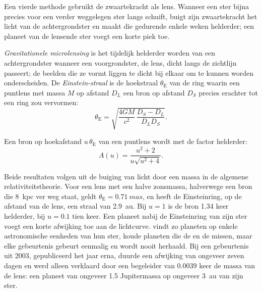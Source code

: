 Een vierde methode gebruikt de zwaartekracht als lens. Wanneer een ster bijna precies
voor een verder weggelegen ster langs schuift, buigt zijn zwaartekracht het licht van de
achtergrondster en maakt die gedurende enkele weken helderder; een planeet van de
lensende ster voegt een korte piek toe.

\begin{definition}\label{def:b3:exoplanets:microlensing}
\emph{Gravitationele microlensing} is het
tijdelijk helderder worden van een achtergrondster wanneer een voorgrondster, de
lens, dicht langs de zichtlijn passeert; de beelden die ze vormt liggen te dicht
bij elkaar om te kunnen worden onderscheiden. De \emph{Einstein-straal}
is de hoekstraal $\theta_\mathrm E$ van de ring waarin een puntlens
met massa $M$ op afstand $D_L$ een bron op afstand $D_S$ precies erachter
tot een ring zou vervormen:
\[
\theta_\mathrm E = \sqrt{\frac{4GM}{c^2}\,\frac{D_S - D_L}{D_L D_S}} .
\]
\end{definition}

\begin{proposition}\label{prop:b3:exoplanets:magnification}
Een bron op hoekafstand $u\,\theta_\mathrm E$ van een puntlens
wordt met de factor helderder:
\[
A(u) = \frac{u^2 + 2}{u\sqrt{u^2 + 4}} .
\]
\end{proposition}

\admitted

Beide resultaten volgen uit de buiging van licht door een massa in de algemene
relativiteitstheorie. Voor een lens met een halve zonsmassa, halverwege een bron
die \qty{8}{kpc} ver weg staat, geldt $\theta_\mathrm E = \qty{0.71}{mas}$, en
heeft de Einsteinring, op de afstand van de lens, een straal van \qty{2.9}{au}. Bij
$u = 1$ is de bron 1.34 keer helderder, bij $u = 0.1$ tien keer. Een
planeet nabij de Einsteinring van zijn ster voegt een korte afwijking toe aan de
lichtcurve.  vindt zo planeten op enkele astronomische
eenheden van hun ster, koude planeten die de  en de  missen,
maar elke gebeurtenis gebeurt eenmalig en wordt nooit herhaald. Bij een gebeurtenis uit 2003,
gepubliceerd het jaar erna, duurde een afwijking van ongeveer zeven dagen en werd
alleen verklaard door een begeleider van $\num{0.0039}$ keer de massa van de
lens: een planeet van ongeveer 1.5 Jupitermassa op ongeveer \qty{3}{au} van
zijn ster.


